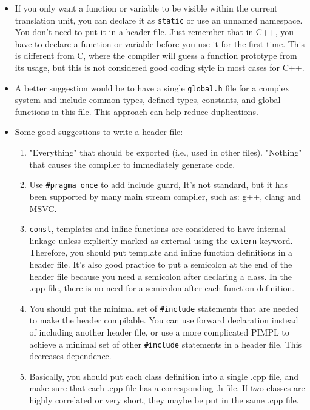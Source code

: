 \documentclass[a4paper,11pt,twoside]{book}
\begin{document}
\begin{itemize}
	
	\item If you only want a function or variable to be visible within the current translation unit, you can declare it as \texttt{static} or use an unnamed namespace. You don't need to put it in a header file. Just remember that in C++, you have to declare a function or variable before you use it for the first time. This is different from C, where the compiler will guess a function prototype from its usage, but this is not considered good coding style in most cases for C++.
	
	\item A better suggestion would be to have a single \texttt{global.h} file for a complex system and include common types, defined types, constants, and global functions in this file. This approach can help reduce duplications.
	
	\item Some good suggestions to write a header file:
	\begin{enumerate}
		\item "Everything" that should be exported (i.e., used in other files). "Nothing" that causes the compiler to immediately generate code.
		
		\item Use \texttt{\#pragma once} to add include guard, It's not standard, but it has been supported by many main stream compiler, such as: g++, clang and MSVC.

		\item \texttt{const}, templates and inline functions are considered to have internal linkage unless explicitly marked as external using the \texttt{extern} keyword. Therefore, you should put template and inline function definitions in a header file. It's also good practice to put a semicolon at the end of the header file because you need a semicolon after declaring a class. In the .cpp file, there is no need for a semicolon after each function definition.

		\item You should put the minimal set of \texttt{\#include} statements that are needed to make the header compilable. You can use forward declaration instead of including another header file, or use a more complicated PIMPL to achieve a minimal set of other \texttt{\#include} statements in a header file. This decreases dependence.
		
		\item Basically, you should put each class definition into a single .cpp file, and make sure that each .cpp file has a corresponding .h file.  If two classes are highly correlated or very short, they maybe be put in the same .cpp file.


\end{enumerate}
\end{itemize}
\end{document}
